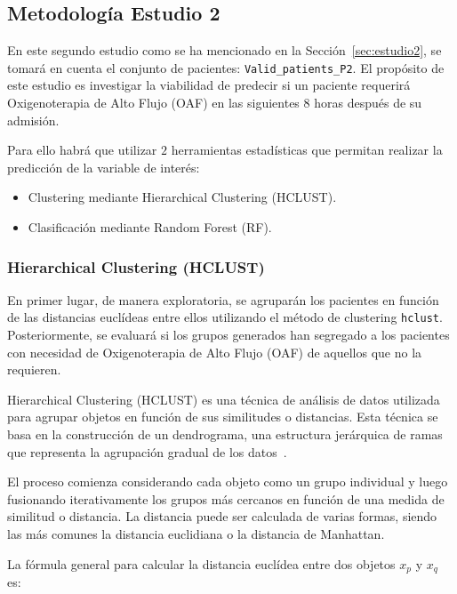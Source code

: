 \subsection{Metodología Estudio 2}\label{sec:metodologia-estudio-2}

En este segundo estudio como se ha mencionado en la Sección~\ref{sec:estudio2}, se tomará en cuenta el conjunto de pacientes: \texttt{Valid\_patients\_P2}. El propósito de este estudio es investigar la viabilidad de predecir si un paciente requerirá Oxigenoterapia de Alto Flujo (OAF) en las siguientes $8$ horas después de su admisión.

Para ello habrá que utilizar $2$ herramientas estadísticas que permitan realizar la predicción de la variable de interés:

\begin{itemize}
    \item Clustering mediante Hierarchical Clustering (HCLUST).
    \item Clasificación mediante Random Forest (RF).
\end{itemize}

\subsubsection{Hierarchical Clustering (HCLUST)}\label{sec:hclust}

En primer lugar, de manera exploratoria, se agruparán los pacientes en función de las distancias euclídeas entre ellos utilizando el método de clustering \texttt{hclust}. Posteriormente, se evaluará si los grupos generados han segregado a los pacientes con necesidad de Oxigenoterapia de Alto Flujo (OAF) de aquellos que no la requieren.

Hierarchical Clustering (HCLUST) es una técnica de análisis de datos utilizada para agrupar objetos en función de sus similitudes o distancias. Esta técnica se basa en la construcción de un dendrograma, una estructura jerárquica de ramas que representa la agrupación gradual de los datos~\cite{jain1988algorithms}.

El proceso comienza considerando cada objeto como un grupo individual y luego fusionando iterativamente los grupos más cercanos en función de una medida de similitud o distancia. La distancia puede ser calculada de varias formas, siendo las más comunes la distancia euclidiana o la distancia de Manhattan.

La fórmula general para calcular la distancia euclídea entre dos objetos \(x_p \) y \(x_q\) es:

